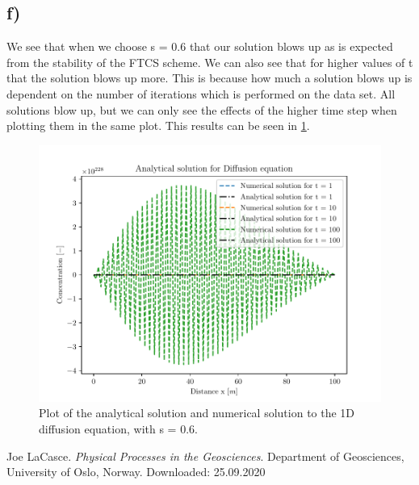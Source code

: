 \documentclass[10pt, a4paper]{amsart}
\begin{document}
\subsection{f)}
We see that when we choose s = 0.6 that our solution blows up as is expected from the stability of the FTCS scheme. We can also see that for higher values of t that the solution blows up more. This is because how much a solution blows up is dependent on the number of iterations which is performed on the data set. All solutions blow up, but we can only see the effects of the higher time step when plotting them in the same plot. This results can be seen in \ref{fig:ex}. 
\begin{figure}[h]
	\centering
	\includegraphics[width=0.9\linewidth]{"../code/exNUMFTCS.pdf"}
	\caption{Plot of the analytical solution and numerical solution to the 1D diffusion equation, with s = 0.6.}
	\label{fig:ex}
\end{figure}

\begin{thebibliography}{1}
	Joe LaCasce. 
	\textit{Physical Processes in the Geosciences}. 
	Department of Geosciences, University of Oslo, Norway. 
	Downloaded: 25.09.2020
\end{thebibliography}
%
\end{document}
